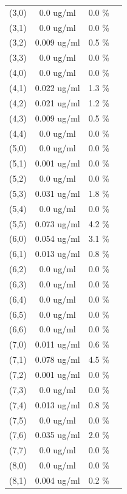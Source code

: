 \documentclass{article}
\begin{document}
\begin{tabular}{c c c c}
(3,0)&        0.0 ug/ml        &0.0 \%\\
(3,1)&        0.0 ug/ml        &0.0 \%\\
(3,2)&        0.009 ug/ml        &0.5 \%\\
(3,3)&        0.0 ug/ml        &0.0 \%\\
(4,0)&        0.0 ug/ml        &0.0 \%\\
(4,1)&        0.022 ug/ml        &1.3 \%\\
(4,2)&        0.021 ug/ml        &1.2 \%\\
(4,3)&        0.009 ug/ml        &0.5 \%\\
(4,4)&        0.0 ug/ml        &0.0 \%\\
(5,0)&        0.0 ug/ml        &0.0 \%\\
(5,1)&        0.001 ug/ml        &0.0 \%\\
(5,2)&        0.0 ug/ml        &0.0 \%\\
(5,3)&        0.031 ug/ml        &1.8 \%\\
(5,4)&        0.0 ug/ml        &0.0 \%\\
(5,5)&        0.073 ug/ml        &4.2 \%\\
(6,0)&        0.054 ug/ml        &3.1 \%\\
(6,1)&        0.013 ug/ml        &0.8 \%\\
(6,2)&        0.0 ug/ml        &0.0 \%\\
(6,3)&        0.0 ug/ml        &0.0 \%\\
(6,4)&        0.0 ug/ml        &0.0 \%\\
(6,5)&        0.0 ug/ml        &0.0 \%\\
(6,6)&        0.0 ug/ml        &0.0 \%\\
(7,0)&        0.011 ug/ml        &0.6 \%\\
(7,1)&        0.078 ug/ml        &4.5 \%\\
(7,2)&        0.001 ug/ml        &0.0 \%\\
(7,3)&        0.0 ug/ml        &0.0 \%\\
(7,4)&        0.013 ug/ml        &0.8 \%\\
(7,5)&        0.0 ug/ml        &0.0 \%\\
(7,6)&        0.035 ug/ml        &2.0 \%\\
(7,7)&        0.0 ug/ml        &0.0 \%\\
(8,0)&        0.0 ug/ml        &0.0 \%\\
(8,1)&        0.004 ug/ml        &0.2 \%\\

\end{tabular}
\end{document}

